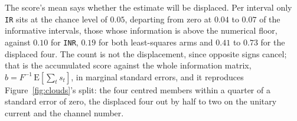 The score's mean says whether the estimate will be displaced. Per interval only \texttt{IR} sits at
the chance level of $0.05$, departing from zero at $0.04$ to $0.07$ of the informative intervals,
those whose information is above the numerical floor, against $0.10$ for \texttt{INR}, $0.19$ for
both least-squares arms and $0.41$ to $0.73$ for the displaced four. The count is not the
displacement, since opposite signs cancel; that is the accumulated score against the whole
information matrix, $b = F^{-1}\,\mathrm{E}[\sum_t s_t]$, in marginal standard errors, and it
reproduces Figure~\ref{fig:clouds}'s split: the four centred members within a quarter of a standard
error of zero, the displaced four out by half to two on the unitary current and the channel number.
